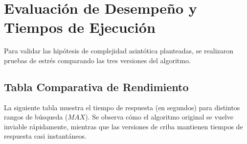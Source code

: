 \newpage
\section{Evaluación de Desempeño y Tiempos de Ejecución}

Para validar las hipótesis de complejidad asintótica planteadas, se realizaron pruebas de estrés comparando las tres versiones del algoritmo.

\subsection{Tabla Comparativa de Rendimiento}
La siguiente tabla muestra el tiempo de respuesta (en segundos) para distintos rangos de búsqueda ($MAX$). Se observa cómo el algoritmo original se vuelve inviable rápidamente, mientras que las versiones de criba mantienen tiempos de respuesta casi instantáneos.

\begin{table}[H]
\centering
{}
\caption{Comparativa de tiempos de ejecución en segundos.}
\end{table}

